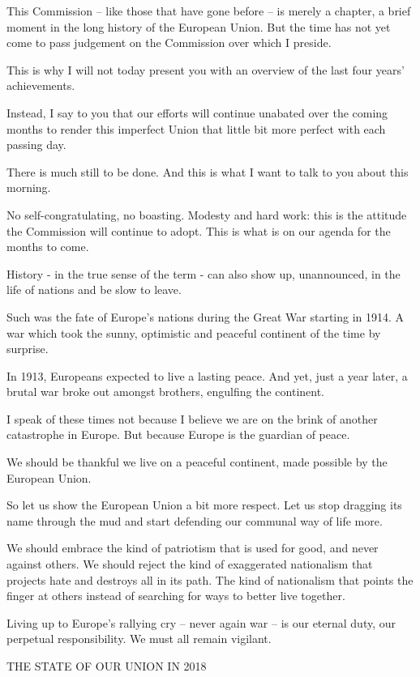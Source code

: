 \documentclass[a4paper,11pt]{article}
\begin{document}
This Commission – like those that have gone before – is merely a chapter, a brief moment in the long history of the European Union. But the time has not yet come to pass judgement on the Commission over which I preside.

This is why I will not today present you with an overview of the last four years' achievements.

Instead, I say to you that our efforts will continue unabated over the coming months to render this imperfect Union that little bit more perfect with each passing day.

There is much still to be done. And this is what I want to talk to you about this morning.

No self-congratulating, no boasting. Modesty and hard work: this is the attitude the Commission will continue to adopt. This is what is on our agenda for the months to come.

History - in the true sense of the term - can also show up, unannounced, in the life of nations and be slow to leave.

Such was the fate of Europe's nations during the Great War starting in 1914. A war which took the sunny, optimistic and peaceful continent of the time by surprise.

In 1913, Europeans expected to live a lasting peace. And yet, just a year later, a brutal war broke out amongst brothers, engulfing the continent.

I speak of these times not because I believe we are on the brink of another catastrophe in Europe. But because Europe is the guardian of peace.

We should be thankful we live on a peaceful continent, made possible by the European Union.

So let us show the European Union a bit more respect. Let us stop dragging its name through the mud and start defending our communal way of life more.

We should embrace the kind of patriotism that is used for good, and never against others. We should reject the kind of exaggerated nationalism that projects hate and destroys all in its path. The kind of nationalism that points the finger at others instead of searching for ways to better live together.

Living up to Europe's rallying cry – never again war – is our eternal duty, our perpetual responsibility. We must all remain vigilant.

 

THE STATE OF OUR UNION IN 2018
\end{document}
